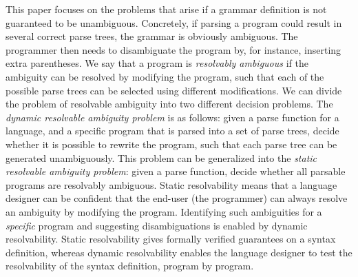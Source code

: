 \documentclass[acmsmall,review,anonymous]{acmart}\settopmatter{printfolios=true,printccs=false,printacmref=false}
\begin{document}


This paper focuses on the problems that arise if a grammar definition
is not guaranteed to be unambiguous. Concretely, if parsing a program
could result in several correct parse trees, the grammar is obviously
ambiguous. The programmer then needs to disambiguate the program by,
for instance, inserting extra parentheses. We say that a program is
\emph{resolvably ambiguous} if the ambiguity can be resolved by
modifying the program, such that each of the possible parse trees can
be selected using different modifications.
%
We can divide the problem of resolvable ambiguity into two
different decision problems.
%
The \emph{dynamic resolvable ambiguity problem} is as follows:
given a parse function for a language, and a specific program that
is parsed into a set of parse trees, decide whether it is possible to
rewrite the program, such that each parse tree can be generated
unambiguously.
%
This problem can be generalized into the \emph{static resolvable
  ambiguity problem}: given a parse function, decide whether all
parsable programs are resolvably ambiguous.
%
Static resolvability means that a language designer can be
confident that the end-user (the programmer) can always resolve an
ambiguity by modifying the program. Identifying such ambiguities
for a \emph{specific} program and suggesting disambiguations is
enabled by dynamic resolvability.
%
Static resolvability gives formally verified guarantees on a
syntax definition, whereas dynamic resolvability enables the
language designer to test the resolvability of the syntax
definition, program by program.



\end{document}
